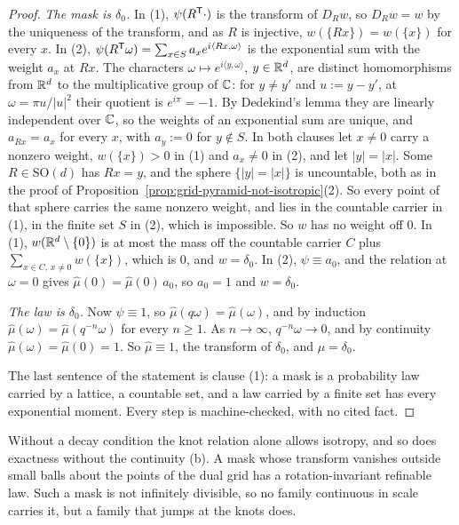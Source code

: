 \begin{proof}
\emph{The mask is $\delta_0$.} In (1), $\psi(R^{\mathsf{T}}\cdot)$ is the transform of $D_Rw$, so
$D_Rw = w$ by the uniqueness of the transform, and as $R$ is injective, $w(\{Rx\}) = w(\{x\})$ for
every $x$. In (2), $\psi(R^{\mathsf{T}}\omega) = \sum_{x \in S}a_xe^{i\langle Rx, \omega\rangle}$ is the
exponential sum with the weight $a_x$ at $Rx$. The characters $\omega \mapsto
e^{i\langle y, \omega\rangle}$, $y \in \mathbb{R}^d$, are distinct homomorphisms from $\mathbb{R}^d$ to the
multiplicative group of $\mathbb{C}$: for $y \ne y'$ and $u := y - y'$, at $\omega = \pi u/|u|^2$ their
quotient is $e^{i\pi} = -1$. By Dedekind's lemma they are linearly independent over $\mathbb{C}$, so the
weights of an exponential sum are unique, and $a_{Rx} = a_x$ for every $x$, with $a_y := 0$ for
$y \notin S$. In both clauses let $x \ne 0$ carry a nonzero weight, $w(\{x\}) > 0$ in (1) and
$a_x \ne 0$ in (2), and let $|y| = |x|$. Some $R \in \mathrm{SO}(d)$ has $Rx = y$, and the sphere
$\{|y| = |x|\}$ is uncountable, both as in the proof of
Proposition~\ref{prop:grid-pyramid-not-isotropic}(2). So every point of that sphere carries the
same nonzero weight, and lies in the countable carrier in (1), in the finite set $S$ in (2), which
is impossible. So $w$ has no weight off $0$. In (1), $w(\mathbb{R}^d \setminus \{0\})$ is at most the mass
off the countable carrier $C$ plus $\sum_{x \in C,\,x \ne 0}w(\{x\})$, which is $0$, and
$w = \delta_0$. In (2), $\psi \equiv a_0$, and the relation at $\omega = 0$ gives
$\widehat\mu(0) = \widehat\mu(0)\,a_0$, so $a_0 = 1$ and $w = \delta_0$.

\emph{The law is $\delta_0$.} Now $\psi \equiv 1$, so $\widehat\mu(q\omega) =
\widehat\mu(\omega)$, and by induction $\widehat\mu(\omega) = \widehat\mu(q^{-n}\omega)$ for every
$n \ge 1$. As $n \to \infty$, $q^{-n}\omega \to 0$, and by continuity $\widehat\mu(\omega) =
\widehat\mu(0) = 1$. So $\widehat\mu \equiv 1$, the transform of $\delta_0$, and $\mu = \delta_0$.

The last sentence of the statement is clause (1): a mask is a probability law carried by a lattice,
a countable set, and a law carried by a finite set has every exponential moment. Every step is
machine-checked, with no cited fact.
\end{proof}

Without a decay condition the knot relation alone allows isotropy, and so does exactness without
the continuity (b). A mask whose transform vanishes outside small balls about the points of the
dual grid has a rotation-invariant refinable law. Such a mask is not infinitely divisible, so no
family continuous in scale carries it, but a family that jumps at the knots does.

